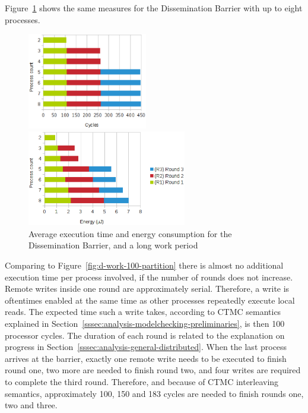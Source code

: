 \documentclass[a4paper, 10pt]{article}
\begin{document}
Figure~\ref{fig:d-work-1000-partition} shows the same measures for the Dissemination Barrier with up to eight processes.
\begin{figure}[htbp]
	\centering
	\begin{minipage}{0.43\linewidth}
		\includegraphics[height=4.2cm]{charts/d-time-work-1000-partition}
	\end{minipage}
	\begin{minipage}{0.56\linewidth}
		\includegraphics[height=4.2cm]{charts/d-energy-work-1000-partition}
	\end{minipage}
	\caption{Average execution time and energy consumption for the Dissemination Barrier, and a long work period}
	\label{fig:d-work-1000-partition}
\end{figure}
Comparing to Figure~\ref{fig:d-work-100-partition} there is almost no additional execution time per process involved, if the number of rounds does not increase.
Remote writes inside one round are approximately serial. Therefore, a write is oftentimes enabled at the same time as other processes repeatedly execute local reads. The expected time such a write takes, according to CTMC semantics explained in Section~\ref{sssec:analysis-modelchecking-preliminaries}, is then 100 processor cycles.
The duration of each round is related to the explanation on progress in Section~\ref{sssec:analysis-general-distributed}. When the last process arrives at the barrier, exactly one remote write needs to be executed to finish round one, two more are needed to finish round two, and four writes are required to complete the third round. Therefore, and because of CTMC interleaving semantics, approximately 100, 150 and 183 cycles are needed to finish rounds one, two and three.
\end{document}
